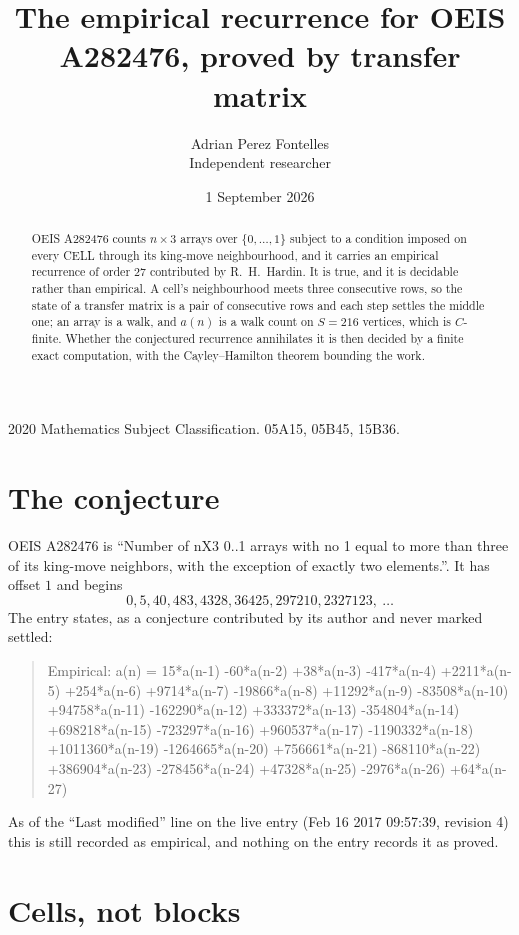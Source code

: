 \documentclass[11pt,a4paper]{article}
\title{The empirical recurrence for OEIS A282476, proved by transfer matrix}
\author{Adrian Perez Fontelles\\ \small Independent researcher}
\date{1 September 2026}
\theoremstyle{plain}
\theoremstyle{definition}
\begin{document}
\maketitle

\begin{abstract}
OEIS A282476 counts $n\times3$ arrays over $\{0,\dots,1\}$ subject to a condition imposed on
every CELL through its king-move neighbourhood, and it carries an empirical recurrence of
order $27$ contributed by R.~H.~Hardin. It is true, and it is decidable rather than
empirical. A cell's neighbourhood meets three consecutive rows, so the state of a transfer
matrix is a pair of consecutive rows and each step settles the middle one; an array is a
walk, and $a(n)$ is a walk count on $S=216$ vertices, which is $C$-finite. Whether the
conjectured recurrence annihilates it is then decided by a finite exact computation, with the
Cayley--Hamilton theorem bounding the work.
\end{abstract}

\noindent\small 2020 Mathematics Subject Classification. 05A15, 05B45, 15B36.\normalsize

\section{The conjecture}

OEIS A282476 is ``Number of nX3 0..1 arrays with no 1 equal to more than three of its king-move neighbors, with the exception of exactly two elements.''. It has offset $1$ and begins
\[
0, 5, 40, 483, 4328, 36425, 297210, 2327123,\ \dots
\]
The entry states, as a conjecture contributed by its author and never marked settled:
\begin{quote}
Empirical: a(n) = 15*a(n-1) -60*a(n-2) +38*a(n-3) -417*a(n-4) +2211*a(n-5) +254*a(n-6) +9714*a(n-7) -19866*a(n-8) +11292*a(n-9) -83508*a(n-10) +94758*a(n-11) -162290*a(n-12) +333372*a(n-13) -354804*a(n-14) +698218*a(n-15) -723297*a(n-16) +960537*a(n-17) -1190332*a(n-18) +1011360*a(n-19) -1264665*a(n-20) +756661*a(n-21) -868110*a(n-22) +386904*a(n-23) -278456*a(n-24) +47328*a(n-25) -2976*a(n-26) +64*a(n-27)
\end{quote}
As of the ``Last modified'' line on the live entry (Feb 16 2017 09:57:39, revision 4) this is still
recorded as empirical, and nothing on the entry records it as proved.

\section{Cells, not blocks}
\end{document}
